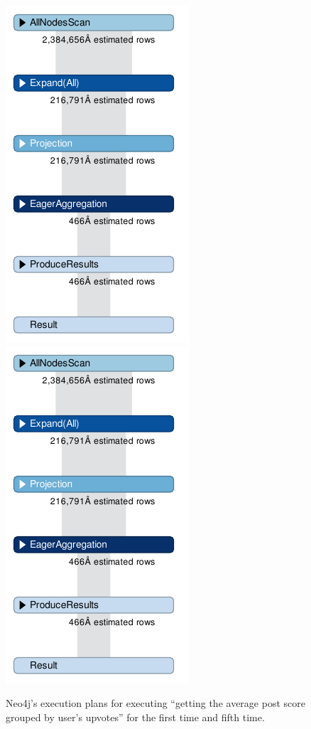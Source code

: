 \begin{figure}
	\centering
	\includegraphics[scale=1.5]{pic/plan.pdf}
	\includegraphics[scale=1.5]{pic/plan2.pdf}
	\caption{Neo4j's execution plans for executing ``getting the average post score grouped by user’s upvotes'' for the first time and fifth time.}
	\label{fig:1:4}
	
\end{figure}

